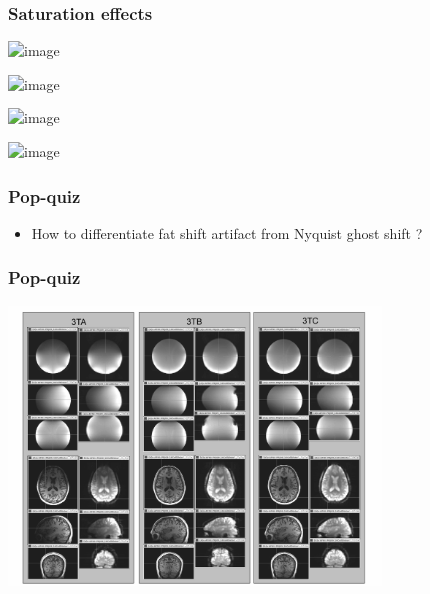 \documentclass{beamer}
\begin{document}
\begin {frame}

\frametitle {Saturation effects}

    \pause

    \centering

        \includegraphics<2>[width=110mm]{Pictures/non-EPSs/Saturation_001.png}

        \includegraphics<3>[width=110mm]{Pictures/non-EPSs/Saturation_002.png}

        \includegraphics<4>[width=110mm]{Pictures/non-EPSs/Saturation_003.png}

        \includegraphics<5>[width=110mm]{Pictures/non-EPSs/Saturation_004.png}

\end {frame}



\begin {frame}

\frametitle {Pop-quiz}

    \pause

    \vspace{-35mm}

    \begin {itemize}

    \item<2> How to differentiate fat shift artifact from Nyquist ghost shift ?

    \end {itemize}

\end {frame}



\begin {frame}

\frametitle {Pop-quiz}

    \vspace{-2mm}

    \centering

        \includegraphics[width=99mm]{Pictures/non-EPSs/NovaCoilComparison.png}

\end {frame}
\end{document}
